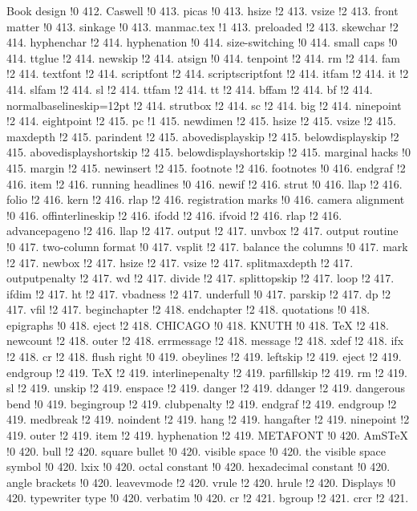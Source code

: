 Book design !0 412.
Caswell !0 413.
picas !0 413.
hsize !2 413.
vsize !2 413.
front matter !0 413.
sinkage !0 413.
manmac.tex !1 413.
preloaded !2 413.
skewchar !2 414.
hyphenchar !2 414.
hyphenation !0 414.
size-switching !0 414.
small caps !0 414.
ttglue !2 414.
newskip !2 414.
atsign !0 414.
tenpoint !2 414.
rm !2 414.
fam !2 414.
textfont !2 414.
scriptfont !2 414.
scriptscriptfont !2 414.
itfam !2 414.
it !2 414.
slfam !2 414.
sl !2 414.
ttfam !2 414.
tt !2 414.
bffam !2 414.
bf !2 414.
normalbaselineskip=12pt !2 414.
strutbox !2 414.
sc !2 414.
big !2 414.
ninepoint !2 414.
eightpoint !2 415.
pc !1 415.
newdimen !2 415.
hsize !2 415.
vsize !2 415.
maxdepth !2 415.
parindent !2 415.
abovedisplayskip !2 415.
belowdisplayskip !2 415.
abovedisplayshortskip !2 415.
belowdisplayshortskip !2 415.
marginal hacks !0 415.
margin !2 415.
newinsert !2 415.
footnote !2 416.
footnotes !0 416.
endgraf !2 416.
item !2 416.
running headlines !0 416.
newif !2 416.
strut !0 416.
llap !2 416.
folio !2 416.
kern !2 416.
rlap !2 416.
registration marks !0 416.
camera alignment !0 416.
offinterlineskip !2 416.
ifodd !2 416.
ifvoid !2 416.
rlap !2 416.
advancepageno !2 416.
llap !2 417.
output !2 417.
unvbox !2 417.
output routine !0 417.
two-column format !0 417.
vsplit !2 417.
balance the columns !0 417.
mark !2 417.
newbox !2 417.
hsize !2 417.
vsize !2 417.
splitmaxdepth !2 417.
outputpenalty !2 417.
wd !2 417.
divide !2 417.
splittopskip !2 417.
loop !2 417.
ifdim !2 417.
ht !2 417.
vbadness !2 417.
underfull !0 417.
parskip !2 417.
dp !2 417.
vfil !2 417.
beginchapter !2 418.
endchapter !2 418.
quotations !0 418.
epigraphs !0 418.
eject !2 418.
CHICAGO !0 418.
KNUTH !0 418.
TeX !2 418.
newcount !2 418.
outer !2 418.
errmessage !2 418.
message !2 418.
xdef !2 418.
ifx !2 418.
cr !2 418.
flush right !0 419.
obeylines !2 419.
leftskip !2 419.
eject !2 419.
endgroup !2 419.
TeX !2 419.
interlinepenalty !2 419.
parfillskip !2 419.
rm !2 419.
sl !2 419.
unskip !2 419.
enspace !2 419.
danger !2 419.
ddanger !2 419.
dangerous bend !0 419.
begingroup !2 419.
clubpenalty !2 419.
endgraf !2 419.
endgroup !2 419.
medbreak !2 419.
noindent !2 419.
hang !2 419.
hangafter !2 419.
ninepoint !2 419.
outer !2 419.
item !2 419.
hyphenation !2 419.
METAFONT !0 420.
AmSTeX !0 420.
bull !2 420.
square bullet !0 420.
visible space !0 420.
the visible space symbol !0 420.
lxix !0 420.
octal constant !0 420.
hexadecimal constant !0 420.
angle brackets !0 420.
leavevmode !2 420.
vrule !2 420.
hrule !2 420.
Displays !0 420.
typewriter type !0 420.
verbatim !0 420.
cr !2 421.
bgroup !2 421.
crcr !2 421.

